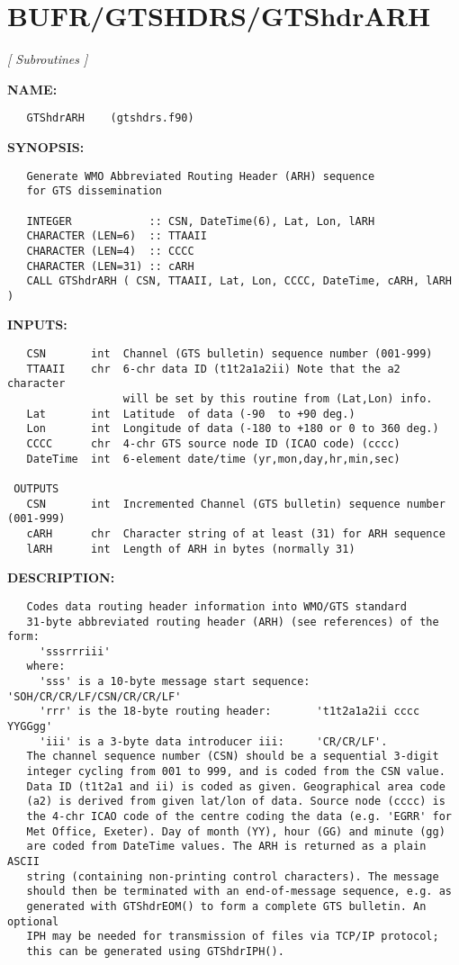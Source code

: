 \section{BUFR/GTSHDRS/GTShdrARH}
\textsl{[ Subroutines ]}

\label{ch:robo8}
\label{ch:BUFR_GTSHDRS_GTShdrARH}
\textbf{NAME:}\hspace{0.08in}\begin{Verbatim}
   GTShdrARH    (gtshdrs.f90)
\end{Verbatim}
\textbf{SYNOPSIS:}\hspace{0.08in}\begin{Verbatim}
   Generate WMO Abbreviated Routing Header (ARH) sequence
   for GTS dissemination

   INTEGER            :: CSN, DateTime(6), Lat, Lon, lARH
   CHARACTER (LEN=6)  :: TTAAII
   CHARACTER (LEN=4)  :: CCCC
   CHARACTER (LEN=31) :: cARH
   CALL GTShdrARH ( CSN, TTAAII, Lat, Lon, CCCC, DateTime, cARH, lARH )
\end{Verbatim}
\textbf{INPUTS:}\hspace{0.08in}\begin{Verbatim}
   CSN       int  Channel (GTS bulletin) sequence number (001-999)
   TTAAII    chr  6-chr data ID (t1t2a1a2ii) Note that the a2 character
                  will be set by this routine from (Lat,Lon) info.
   Lat       int  Latitude  of data (-90  to +90 deg.)
   Lon       int  Longitude of data (-180 to +180 or 0 to 360 deg.)
   CCCC      chr  4-chr GTS source node ID (ICAO code) (cccc)
   DateTime  int  6-element date/time (yr,mon,day,hr,min,sec)

 OUTPUTS
   CSN       int  Incremented Channel (GTS bulletin) sequence number (001-999)
   cARH      chr  Character string of at least (31) for ARH sequence
   lARH      int  Length of ARH in bytes (normally 31)
\end{Verbatim}
\textbf{DESCRIPTION:}\hspace{0.08in}\begin{Verbatim}
   Codes data routing header information into WMO/GTS standard
   31-byte abbreviated routing header (ARH) (see references) of the form:
     'sssrrriii'
   where:
     'sss' is a 10-byte message start sequence: 'SOH/CR/CR/LF/CSN/CR/CR/LF'
     'rrr' is the 18-byte routing header:       't1t2a1a2ii cccc YYGGgg'
     'iii' is a 3-byte data introducer iii:     'CR/CR/LF'.
   The channel sequence number (CSN) should be a sequential 3-digit
   integer cycling from 001 to 999, and is coded from the CSN value.
   Data ID (t1t2a1 and ii) is coded as given. Geographical area code
   (a2) is derived from given lat/lon of data. Source node (cccc) is
   the 4-chr ICAO code of the centre coding the data (e.g. 'EGRR' for
   Met Office, Exeter). Day of month (YY), hour (GG) and minute (gg)
   are coded from DateTime values. The ARH is returned as a plain ASCII
   string (containing non-printing control characters). The message
   should then be terminated with an end-of-message sequence, e.g. as
   generated with GTShdrEOM() to form a complete GTS bulletin. An optional
   IPH may be needed for transmission of files via TCP/IP protocol;
   this can be generated using GTShdrIPH().
\end{Verbatim}
